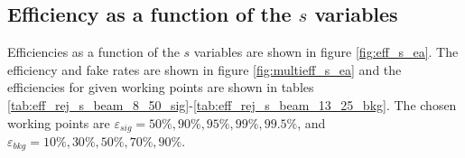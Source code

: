 \subsection{Efficiency as a function of the $s$ variables}

Efficiencies as a function of the $s$ variables are shown in figure \ref{fig:eff_s_ea}.  The efficiency and fake rates are shown in figure \ref{fig:multieff_s_ea} and the efficiencies for given working points are shown in tables \ref{tab:eff_rej_s_beam_8_50_sig}-\ref{tab:eff_rej_s_beam_13_25_bkg}.  The chosen working points are $\varepsilon_{sig}=50\%, 90\%, 95\%, 99\%, 99.5\%$, and $\varepsilon_{bkg}=10\%, 30\%, 50\%, 70\%, 90\%$.




